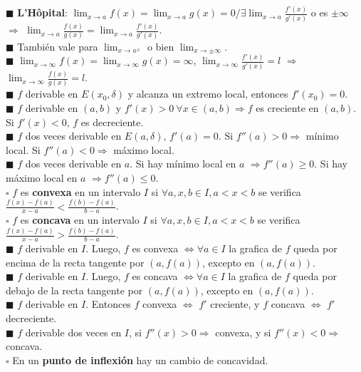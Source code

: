 \documentclass[11pt,a4paper]{article}
\begin{document}
$\blacksquare$ \textbf{L'Hôpital}: $\lim_{x \to a} f(x) = \lim_{x \to a} g(x) = 0 / \exists \lim_{x \to a} \frac{f'(x)}{g'(x)}$ o es $\pm \infty$ $\Rightarrow$ $\lim_{x \to a} \frac{f(x)}{g(x)} = \lim_{x \to a} \frac{f'(x)}{g'(x)}$.\\
$\blacksquare$ Tambi\'en vale para $\lim_{x \to a^{\pm}}$ o bien $\lim_{x \to \pm\infty}$.\\
$\blacksquare$ $\lim_{x \to \infty} f(x) = \lim_{x \to \infty} g(x) = \infty$, $\lim_{x \to \infty}\frac{f'(x)}{g'(x)} = l$ $\Rightarrow$ $\lim_{x \to \infty} \frac{f(x)}{g(x)} = l$.\\
$\blacksquare$ $f$ derivable en $E(x_0, \delta)$ y alcanza un extremo local, entonces $f'(x_0) = 0$.\\
$\blacksquare$ $f$ derivable en $(a,b)$ y $f'(x) > 0 \ \forall x \in (a, b) \Rightarrow f$ es creciente en $(a,b)$. Si $f'(x)<0$, $f$ es decreciente.\\
$\blacksquare$ $f$ {\footnotesize{dos veces derivable en}} $E(a, \delta)$, $f'(a)=0$. {\footnotesize{Si}} $f''(a) > 0 \Rightarrow$ m\'inimo local. {\footnotesize{Si}} $f''(a) < 0 \Rightarrow$ m\'aximo local.\\
$\blacksquare$ $f$ {\footnotesize{dos veces derivable en}} $a$. {\footnotesize{Si}} hay m\'inimo local en $a$ $\Rightarrow f''(a) \geq 0$. {\footnotesize{Si}} hay m\'aximo local en $a$ $\Rightarrow f''(a) \leq 0$.\\
$\square$ $f$ es \textbf{convexa} en un intervalo $I$ si $\forall a,x,b \in I, a<x<b$ se verifica $\frac{f(x)-f(a)}{x-a} < \frac{f(b)-f(a)}{b-a}$.\\
$\square$ $f$ es \textbf{concava} en un intervalo $I$ si $\forall a,x,b \in I, a<x<b$ se verifica $\frac{f(x)-f(a)}{x-a} > \frac{f(b)-f(a)}{b-a}$.\\
$\blacksquare$ $f$ derivable en $I$. Luego, $f$ es convexa $\iff \forall a \in I$ la grafica de $f$ queda por encima de la recta tangente por $(a,f(a))$, excepto en $(a,f(a))$.\\
$\blacksquare$ $f$ derivable en $I$. Luego, $f$ es concava $\iff \forall a \in I$ la grafica de $f$ queda por debajo de la recta tangente por $(a,f(a))$, excepto en $(a,f(a))$.\\
$\blacksquare$ $f$ derivable en $I$. Entonces $f$ convexa $\iff$ $f'$ creciente, y $f$ concava $\iff$ $f'$ decreciente. \\
$\blacksquare$ $f$ derivable dos veces en $I$, si $f''(x) > 0 \Rightarrow$ convexa, y si $f''(x) < 0 \Rightarrow$ concava.\\
$\square$ En un \textbf{punto de inflexi\'on} hay un cambio de concavidad.\\
\end{document}
